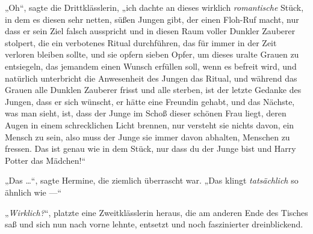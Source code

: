 „Oh“, sagte die Drittklässlerin, „ich dachte an dieses wirklich \emph{romantische} Stück, in dem es diesen sehr netten, süßen Jungen gibt, der einen Floh-Ruf macht, nur dass er sein Ziel falsch ausspricht und in diesen Raum voller Dunkler Zauberer stolpert, die ein verbotenes Ritual durchführen, das für immer in der Zeit verloren bleiben sollte, und sie opfern sieben Opfer, um dieses uralte Grauen zu entsiegeln, das jemandem einen Wunsch erfüllen soll, wenn es befreit wird, und natürlich unterbricht die Anwesenheit des Jungen das Ritual, und während das Grauen alle Dunklen Zauberer frisst und alle sterben, ist der letzte Gedanke des Jungen, dass er sich wünscht, er hätte eine Freundin gehabt, und das Nächste, was man sieht, ist, dass der Junge im Schoß dieser schönen Frau liegt, deren Augen in einem schrecklichen Licht brennen, nur versteht sie nichts davon, ein Mensch zu sein, also muss der Junge sie immer davon abhalten, Menschen zu fressen. Das ist genau wie in dem Stück, nur dass du der Junge bist und Harry Potter das Mädchen!“

„Das …“, sagte Hermine, die ziemlich überrascht war.
„Das klingt \emph{tatsächlich} so ähnlich wie —“

„\emph{Wirklich?}“, platzte eine Zweitklässlerin heraus, die am anderen Ende des Tisches saß und sich nun nach vorne lehnte, entsetzt und noch faszinierter dreinblickend.

